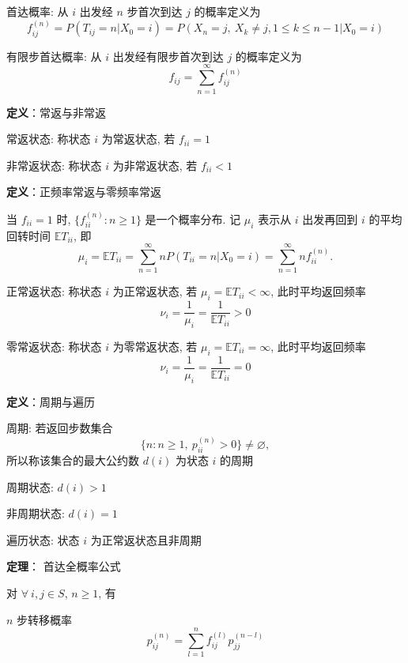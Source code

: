 \documentclass[openany]{ctexbook}
\theoremstyle{kaiti}
\theoremstyle{normal}
\begin{document}
首达概率: 从 $i$ 出发经 $n$ 步首次到达 $j$ 的概率定义为 
\begin{equation}
  f_{ij}^{(n)}=P(T_{ij}=n|X_0=i)=P(X_n=j,~X_k\neq j,1\leqslant k\leqslant n-1|X_0=i)
\end{equation}

有限步首达概率: 从 $i$ 出发经有限步首次到达 $j$ 的概率定义为
\begin{equation}
  f_{ij}=\sum_{n=1}^\infty f_{ij}^{(n)}
\end{equation}


\textbf{定义}：常返与非常返

常返状态: 称状态 $i$ 为常返状态, 若 $f_{ii}=1$

非常返状态: 称状态 $i$ 为非常返状态, 若 $f_{ii}<1$

\textbf{定义}：正频率常返与零频率常返

当 $f_{ii}=1$ 时, $\Big\{f_{ii}^{(n)}:n\geqslant1\Big\}$ 是一个概率分布. 记 $\mu_i$ 表示从 $i$ 出发再回到 $i$ 的平均回转时间 $\mathbb{E}T_{ii}$, 即
\begin{equation}
  \mu_i=\mathbb{E}T_{ii}=\sum_{n=1}^\infty n P(T_{ii}=n|X_0=i)=\sum_{n=1}^\infty nf_{ii}^{(n)}.
\end{equation}

正常返状态: 称状态 $i$ 为正常返状态, 若 $\mu_i=\mathbb{E}T_{ii}<\infty$, 此时平均返回频率
\begin{equation}
  \nu_i=\frac{1}{\mu_i}=\frac{1}{\mathbb{E}T_{ii}}>0
\end{equation}

零常返状态: 称状态 $i$ 为零常返状态, 若 $\mu_i=\mathbb{E}T_{ii}=\infty$, 此时平均返回频率
\begin{equation}
  \nu_i=\frac{1}{\mu_i}=\frac{1}{\mathbb{E}T_{ii}}=0
\end{equation}

\textbf{定义}：周期与遍历

周期: 若返回步数集合 
\begin{equation}
  \Big\{n:n\geqslant1,~p_{ii}^{(n)}>0\Big\}\neq\varnothing,
\end{equation} 
所以称该集合的最大公约数 $d(i)$ 为状态 $i$ 的周期

周期状态: $d(i)>1$

非周期状态: $d(i)=1$

遍历状态: 状态 $i$ 为正常返状态且非周期

\textbf{定理}： 首达全概率公式

对 $\forall~i,j\in S$, $n\geqslant1$, 有

$n$ 步转移概率
\begin{equation}
  p_{ij}^{(n)}=\sum_{l=1}^n f_{ij}^{(l)}p_{jj}^{(n-l)}
\end{equation}
\end{document}
